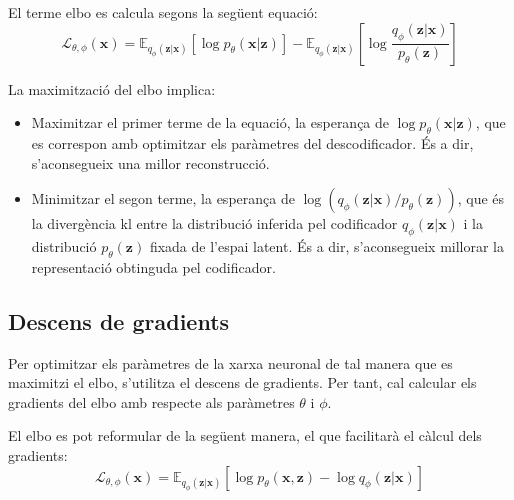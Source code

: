 \documentclass[CAT,BIB]{TFUOC}%
\begin{document}
        El terme \gls{elbo} es calcula segons la següent equació:
        \begin{equation}
        \label{eq:elbo}
            \mathcal{L}_{\theta,\phi}(\mathbf{x}) =
            \mathbb{E}_{q_\phi(\mathbf{z|x})}
                [ \log p_\theta(\mathbf{x|z}) ] -
            \mathbb{E}_{q_\phi(\mathbf{z|x})} \left[
                \log \frac {q_\phi(\mathbf{z|x})}
                           {p_\theta(\mathbf{z})}
            \right]
        \end{equation}

        La maximització del \gls{elbo} implica:
        \begin{itemize}
            \item Maximitzar el primer terme de la equació,
            la esperança de $\log p_\theta(\mathbf{x|z})$,
            que es correspon amb optimitzar els paràmetres del descodificador.
            És a dir, s'aconsegueix una millor reconstrucció.

            \item Minimitzar el segon terme,
            la esperança de $\log ( q_\phi(\mathbf{z|x}) / p_\theta(\mathbf{z}) )$,
            que és la divergència \gls{kl} entre
            la distribució inferida pel codificador $q_\phi(\mathbf{z|x})$
            i la distribució $p_\theta(\mathbf{z})$ fixada de l'espai latent.
            És a dir, s'aconsegueix millorar la representació obtinguda pel codificador.
        \end{itemize}

    \subsection{Descens de gradients}
    \label{s:vae_gradients}

        Per optimitzar els paràmetres de la xarxa neuronal
        de tal manera que es maximitzi el \gls{elbo},
        s'utilitza el descens de gradients.
        Per tant, cal calcular els gradients del \gls{elbo}
        amb respecte als paràmetres $\theta$ i $\phi$.

        El \gls{elbo} es pot reformular de la següent manera,
        el que facilitarà el càlcul dels gradients:
        \begin{equation}
        \label{eq:elbo_2}
            \mathcal{L}_{\theta,\phi}(\mathbf{x}) =
            \mathbb{E}_{q_\phi(\mathbf{z|x})} [
                \log p_\theta(\mathbf{x,z}) -
                \log q_\phi(\mathbf{z|x})
            ]
        \end{equation}
\end{document}
